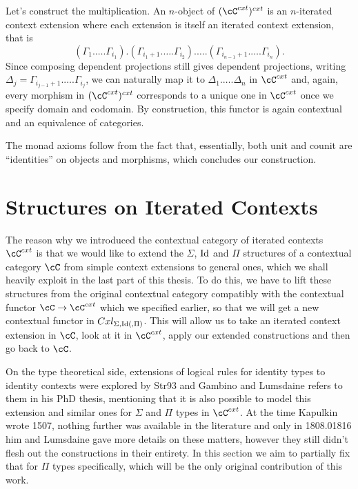 \documentclass[a4paper,fontsize=12pt]{scrartcl}
\begin{document}
\begin{construction}
  Let's construct the multiplication. An $n$-object of $(\cC^{cxt})^{cxt}$ is an
  $n$-iterated context extension where each extension is itself an iterated
  context extension, that is
  \[(\Gamma_1.\ldots.\Gamma_{i_1}).(\Gamma_{i_1+1}.\ldots.\Gamma_{i_2}).\ldots.(\Gamma_{i_{n-1}+1}.\ldots.\Gamma_{i_n}).\]
  Since composing dependent projections still gives dependent projections,
  writing $\Delta_j=\Gamma_{i_{j-1}+1}.\ldots.\Gamma_{i_j}$, we can naturally
  map it to $\Delta_1.\ldots.\Delta_n$ in $\cC^{cxt}$ and, again, every morphism
  in $(\cC^{cxt})^{cxt}$ corresponds to a unique one in $\cC^{cxt}$ once we
  specify domain and codomain. By construction, this functor is again contextual
  and an equivalence of categories.

  The monad axioms follow from the fact that, essentially, both unit and counit
  are ``identities'' on objects and morphisms, which concludes our construction.
\end{construction}


\section{Structures on Iterated Contexts}

The reason why we introduced the contextual category of iterated contexts
$\cC^{cxt}$ is that we would like to extend the $\Sigma$, $\operatorname{Id}$
and $\Pi$ structures of a contextual category $\cC$ from simple context
extensions to general ones, which we shall heavily exploit in the last part of
this thesis. To do this, we have to lift these structures from the original
contextual category compatibly with the contextual functor
$\cC\rightarrow\cC^{cxt}$ which we specified earlier, so that we will get a new
contextual functor in $Cxl_{\Sigma,\operatorname{Id}(,\Pi)}$. This will allow us to take an
iterated context extension in $\cC$, look at it in $\cC^{cxt}$, apply our
extended constructions and then go back to $\cC$.

On the type theoretical side, extensions of logical rules for identity types to
identity contexts were explored by Str93 and Gambino  and Lumsdaine
refers to them in his PhD thesis, mentioning that it is also possible to
model this extension and similar ones for $\Sigma$ and $\Pi$ types in
$\cC^{cxt}$. At
the time Kapulkin wrote 1507, nothing further was available in the literature
and only in 1808.01816 him and Lumsdaine gave more details on these matters,
however they still didn't flesh out the constructions in their entirety. In this
section we aim to partially fix that for $\Pi$ types specifically, which will be
the only original contribution of this work.
\end{document}
